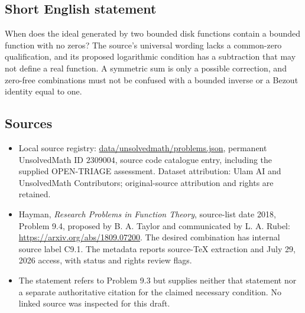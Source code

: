 \documentclass[11pt]{article}
\begin{document}
\subsection{Short English statement}
When does the ideal generated by two bounded disk functions contain a bounded function with no zeros? The source's universal wording lacks a common-zero qualification, and its proposed logarithmic condition has a subtraction that may not define a real function. A symmetric sum is only a possible correction, and zero-free combinations must not be confused with a bounded inverse or a Bezout identity equal to one.
\subsection{Sources}
\begin{itemize}
\item Local source registry: \url{data/unsolvedmath/problems.json}, permanent UnsolvedMath ID $2309004$, source code catalogue entry, including the supplied OPEN-TRIAGE assessment. Dataset attribution: Ulam AI and UnsolvedMath Contributors; original-source attribution and rights are retained.
\item Hayman, \emph{Research Problems in Function Theory}, source-list date 2018, Problem 9.4, proposed by B. A. Taylor and communicated by L. A. Rubel: \url{https://arxiv.org/abs/1809.07200}. The desired combination has internal source label C9.1. The metadata reports source-TeX extraction and July 29, 2026 access, with status and rights review flags.
\item The statement refers to Problem 9.3 but supplies neither that statement nor a separate authoritative citation for the claimed necessary condition. No linked source was inspected for this draft.
\end{itemize}
\end{document}

